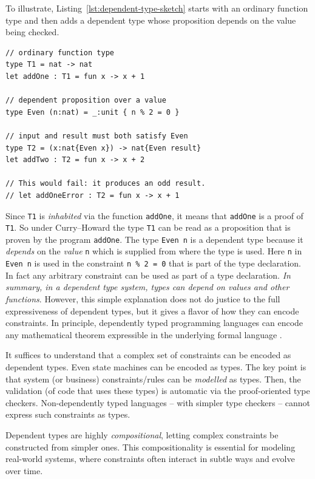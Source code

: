 \documentclass[conference]{IEEEtran}
\begin{document}
To illustrate, Listing~\ref{lst:dependent-type-sketch} starts with an ordinary function type and then adds a dependent type whose proposition depends on the value being checked.

\begin{lstlisting}[style=fstar,caption={Small F* dependent-type sketch.},label={lst:dependent-type-sketch}]
// ordinary function type
type T1 = nat -> nat
let addOne : T1 = fun x -> x + 1

// dependent proposition over a value
type Even (n:nat) = _:unit { n % 2 = 0 }

// input and result must both satisfy Even
type T2 = (x:nat{Even x}) -> nat{Even result}
let addTwo : T2 = fun x -> x + 2

// This would fail: it produces an odd result.
// let addOneError : T2 = fun x -> x + 1
\end{lstlisting}

Since \texttt{T1} is \textit{inhabited} via the function \texttt{addOne}, it means that \texttt{addOne} is a proof of \texttt{T1}. So under Curry--Howard the type \texttt{T1} can be read as a proposition that is proven by the program \texttt{addOne}. The type \texttt{Even n} is a dependent type because it \textit{depends} on the \textit{value} \texttt{n} which is supplied from where the type is used. Here \texttt{n} in \texttt{Even n} is used in the constraint \texttt{n \% 2 = 0} that is part of the type declaration. In fact any arbitrary constraint can be used as part of a type declaration.
\textit{In summary, in a dependent type system, types can depend on values and other functions}. However, this simple explanation does not do justice to the full expressiveness of dependent types, but it gives a flavor of how they can encode constraints. In principle, dependently typed programming languages can encode any mathematical theorem expressible in the underlying formal language \cite{mathematics_in_lean}.

It suffices to understand that a complex set of constraints can be encoded as dependent types. Even state machines can be encoded as types. The key point is that system (or business) constraints/rules can be \textit{modelled} as types. Then, the validation (of code that uses these types) is automatic via the proof-oriented type checkers. Non-dependently typed languages -- with simpler type checkers -- cannot express such constraints as types.

Dependent types are highly \textit{compositional}, letting complex constraints be constructed from simpler ones. This compositionality is essential for modeling real-world systems, where constraints often interact in subtle ways and evolve over time.
\end{document}
